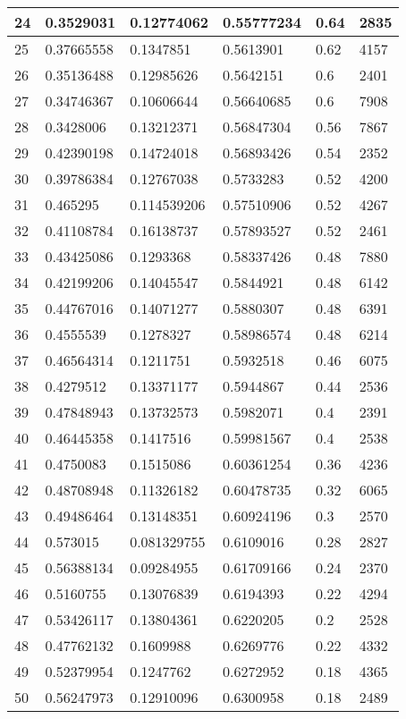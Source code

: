 \begin{longtable}{|l|l|l|l|l|l|}
24 & 0.3529031 & 0.12774062 & 0.55777234 & 0.64 & 2835 \\ \hline 
25 & 0.37665558 & 0.1347851 & 0.5613901 & 0.62 & 4157 \\ \hline 
26 & 0.35136488 & 0.12985626 & 0.5642151 & 0.6 & 2401 \\ \hline 
27 & 0.34746367 & 0.10606644 & 0.56640685 & 0.6 & 7908 \\ \hline 
28 & 0.3428006 & 0.13212371 & 0.56847304 & 0.56 & 7867 \\ \hline 
29 & 0.42390198 & 0.14724018 & 0.56893426 & 0.54 & 2352 \\ \hline 
30 & 0.39786384 & 0.12767038 & 0.5733283 & 0.52 & 4200 \\ \hline 
31 & 0.465295 & 0.114539206 & 0.57510906 & 0.52 & 4267 \\ \hline 
32 & 0.41108784 & 0.16138737 & 0.57893527 & 0.52 & 2461 \\ \hline 
33 & 0.43425086 & 0.1293368 & 0.58337426 & 0.48 & 7880 \\ \hline 
34 & 0.42199206 & 0.14045547 & 0.5844921 & 0.48 & 6142 \\ \hline 
35 & 0.44767016 & 0.14071277 & 0.5880307 & 0.48 & 6391 \\ \hline 
36 & 0.4555539 & 0.1278327 & 0.58986574 & 0.48 & 6214 \\ \hline 
37 & 0.46564314 & 0.1211751 & 0.5932518 & 0.46 & 6075 \\ \hline 
38 & 0.4279512 & 0.13371177 & 0.5944867 & 0.44 & 2536 \\ \hline 
39 & 0.47848943 & 0.13732573 & 0.5982071 & 0.4 & 2391 \\ \hline 
40 & 0.46445358 & 0.1417516 & 0.59981567 & 0.4 & 2538 \\ \hline 
41 & 0.4750083 & 0.1515086 & 0.60361254 & 0.36 & 4236 \\ \hline 
42 & 0.48708948 & 0.11326182 & 0.60478735 & 0.32 & 6065 \\ \hline 
43 & 0.49486464 & 0.13148351 & 0.60924196 & 0.3 & 2570 \\ \hline 
44 & 0.573015 & 0.081329755 & 0.6109016 & 0.28 & 2827 \\ \hline 
45 & 0.56388134 & 0.09284955 & 0.61709166 & 0.24 & 2370 \\ \hline 
46 & 0.5160755 & 0.13076839 & 0.6194393 & 0.22 & 4294 \\ \hline 
47 & 0.53426117 & 0.13804361 & 0.6220205 & 0.2 & 2528 \\ \hline 
48 & 0.47762132 & 0.1609988 & 0.6269776 & 0.22 & 4332 \\ \hline 
49 & 0.52379954 & 0.1247762 & 0.6272952 & 0.18 & 4365 \\ \hline 
50 & 0.56247973 & 0.12910096 & 0.6300958 & 0.18 & 2489 \\ \hline 
\end{longtable}